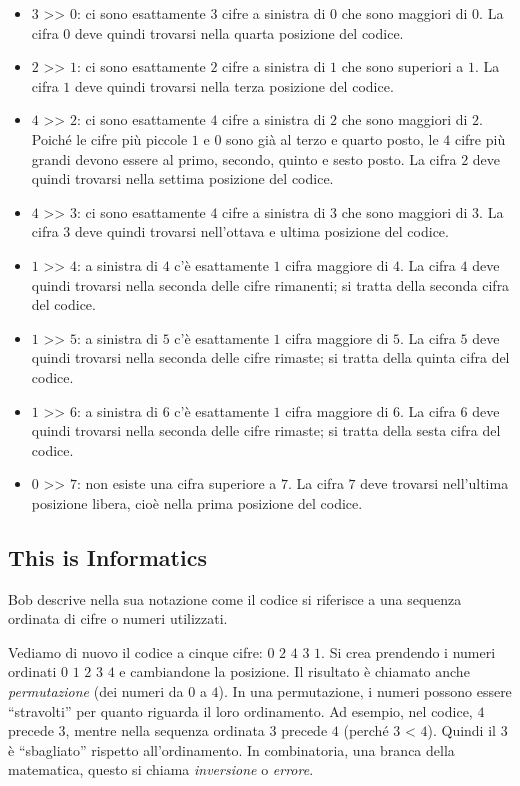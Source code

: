 \documentclass[a4paper,11pt]{report}
\begin{document}
\begin{itemize}
  \item $3$ >\textcompwordmark{}> $0$: ci sono esattamente $3$ cifre a sinistra di $0$ che sono maggiori di $0$.
La cifra $0$ deve quindi trovarsi nella quarta posizione del codice.
  \item $2$ >\textcompwordmark{}> $1$: ci sono esattamente $2$ cifre a sinistra di $1$ che sono superiori a $1$.
La cifra $1$ deve quindi trovarsi nella terza posizione del codice.
  \item $4$ >\textcompwordmark{}> $2$: ci sono esattamente $4$ cifre a sinistra di $2$ che sono maggiori di $2$.
Poiché le cifre più piccole $1$ e $0$ sono già al terzo e quarto posto,
le $4$ cifre più grandi devono essere al primo, secondo, quinto e sesto posto.
La cifra $2$ deve quindi trovarsi nella settima posizione del codice.
  \item $4$ >\textcompwordmark{}> $3$: ci sono esattamente $4$ cifre a sinistra di $3$ che sono maggiori di $3$.
La cifra $3$ deve quindi trovarsi nell’ottava e ultima posizione del codice.
  \item $1$ >\textcompwordmark{}> $4$: a sinistra di $4$ c’è esattamente $1$ cifra maggiore di $4$.
La cifra $4$ deve quindi trovarsi nella seconda delle cifre rimanenti; si tratta della seconda cifra del codice.
  \item $1$ >\textcompwordmark{}> $5$: a sinistra di $5$ c’è esattamente $1$ cifra maggiore di $5$.
La cifra $5$ deve quindi trovarsi nella seconda delle cifre rimaste; si tratta della quinta cifra del codice.
  \item $1$ >\textcompwordmark{}> $6$: a sinistra di $6$ c’è esattamente $1$ cifra maggiore di $6$.
La cifra $6$ deve quindi trovarsi nella seconda delle cifre rimaste; si tratta della sesta cifra del codice.
  \item $0$ >\textcompwordmark{}> $7$: non esiste una cifra superiore a $7$.
La cifra $7$ deve trovarsi nell’ultima posizione libera, cioè nella prima posizione del codice.
\end{itemize}


\subsection*{This is Informatics}

Bob descrive nella sua notazione come il codice si riferisce a una sequenza ordinata di cifre o numeri utilizzati.

Vediamo di nuovo il codice a cinque cifre: $0$ $2$ $4$ $3$ $1$.
Si crea prendendo i numeri ordinati $0$ $1$ $2$ $3$ $4$ e cambiandone la posizione.  Il risultato è chiamato anche \emph{permutazione} (dei numeri da $0$ a $4$).
In una permutazione, i numeri possono essere \enquote{stravolti} per quanto riguarda il loro ordinamento.
Ad esempio, nel codice, $4$ precede $3$, mentre nella sequenza ordinata $3$ precede $4$ (perché $3$ < $4$).
Quindi il $3$ è \enquote{sbagliato} rispetto all’ordinamento. In combinatoria, una branca della matematica, questo si chiama \emph{inversione} o \emph{errore}.
\end{document}
